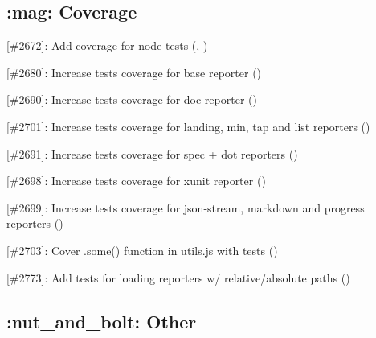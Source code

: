 \subsection*{\+:mag\+: Coverage}


\begin{DoxyItemize}
\item \mbox{[}\#2672\mbox{]}\+: Add coverage for node tests (\href{https://github.com/c089}{\tt }, \href{https://github.com/munter}{\tt })
\item \mbox{[}\#2680\mbox{]}\+: Increase tests coverage for base reporter (\href{https://github.com/epallerols}{\tt })
\item \mbox{[}\#2690\mbox{]}\+: Increase tests coverage for doc reporter (\href{https://github.com/craigtaub}{\tt })
\item \mbox{[}\#2701\mbox{]}\+: Increase tests coverage for landing, min, tap and list reporters (\href{https://github.com/craigtaub}{\tt })
\item \mbox{[}\#2691\mbox{]}\+: Increase tests coverage for spec + dot reporters (\href{https://github.com/craigtaub}{\tt })
\item \mbox{[}\#2698\mbox{]}\+: Increase tests coverage for xunit reporter (\href{https://github.com/craigtaub}{\tt })
\item \mbox{[}\#2699\mbox{]}\+: Increase tests coverage for json-\/stream, markdown and progress reporters (\href{https://github.com/craigtaub}{\tt })
\item \mbox{[}\#2703\mbox{]}\+: Cover .some() function in utils.\+js with tests (\href{https://github.com/seppevs}{\tt })
\item \mbox{[}\#2773\mbox{]}\+: Add tests for loading reporters w/ relative/absolute paths (\href{https://github.com/sul4bh}{\tt })
\end{DoxyItemize}

\subsection*{\+:nut\+\_\+and\+\_\+bolt\+: Other}


